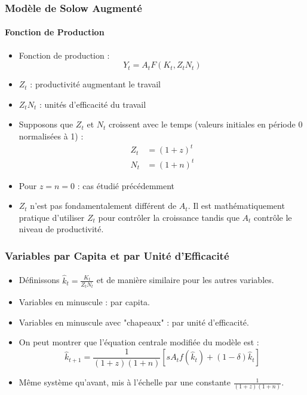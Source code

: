 \documentclass{beamer}
\begin{document}
\begin{frame}
    \frametitle{Modèle de Solow Augmenté}
    \framesubtitle{Fonction de Production}

    \begin{itemize}
        \item Fonction de production :
        \[
        Y_t = A_t F(K_t, Z_t N_t)
        \]
        \item \( Z_t \) : productivité augmentant le travail
        \item \( Z_t N_t \) : unités d'efficacité du travail
        \item Supposons que \( Z_t \) et \( N_t \) croissent avec le temps (valeurs initiales en période 0 normalisées à 1) :
            \begin{align*}
                Z_t &= (1 + z)^t \\
                N_t &= (1 + n)^t
            \end{align*}
        \item Pour \( z = n = 0 \) : cas étudié précédemment
        \item \( Z_t \) n'est pas fondamentalement différent de \( A_t \). Il est mathématiquement pratique d'utiliser \( Z_t \) pour contrôler la croissance tandis que \( A_t \) contrôle le niveau de productivité.
    \end{itemize}
\end{frame}

\begin{frame}
    \frametitle{Variables par Capita et par Unité d'Efficacité}
    \framesubtitle{}

    \begin{itemize}
        \item Définissons \( \hat{k}_t = \frac{K_t}{Z_t N_t} \) et de manière similaire pour les autres variables.
        \item Variables en minuscule : par capita.
        \item Variables en minuscule avec "chapeaux" : par unité d'efficacité.
        \item On peut montrer que l'équation centrale modifiée du modèle est :
        \[
        \hat{k}_{t+1} = \frac{1}{(1 + z)(1 + n)} \left[ s A_t f(\hat{k}_t) + (1 - \delta) \hat{k}_t \right]
        \]
        \item Même système qu'avant, mis à l'échelle par une constante \( \frac{1}{(1 + z)(1 + n)} \).
    \end{itemize}
\end{frame}
\end{document}
